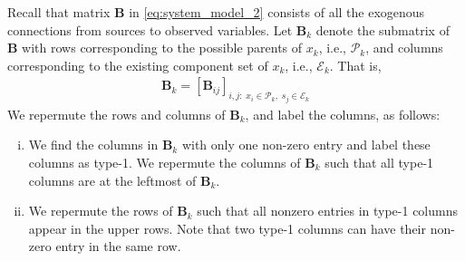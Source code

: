 \documentclass[12pt]{article}
\newcommand{\bB}{\mathbf{B}}
\begin{document}
Recall that matrix $\bB$ in \eqref{eq:system_model_2} consists of all the exogenous connections from sources to observed variables. 
Let $\bB_k$ denote the submatrix of $\bB$ with rows corresponding to the possible parents of $x_k$, i.e., $\mathcal{P}_k$, and columns corresponding to the existing component set of $x_k$, i.e., $\mathcal{E}_k$. That is,
\begin{align}
    \bB_k = \left[\bB_{ij}\right]_{i,j:\;x_i\in \mathcal{P}_k,\;s_j\in \mathcal{E}_k}
\end{align}
We repermute the rows and columns of $\bB_k$, and label the columns, as follows:
\begin{enumerate}[(i)]
    \item We find the columns in $\bB_k$ with only one non-zero entry and label these columns as type-1. We repermute the columns of $\bB_k$ such that all type-1 columns are at the leftmost of $\bB_k$.
    
    \item We repermute the rows of $\bB_k$ such that all nonzero entries in type-1 columns appear in the upper rows. Note that two type-1 columns can have their non-zero entry in the same row. 
    

\end{enumerate}
\end{document}
